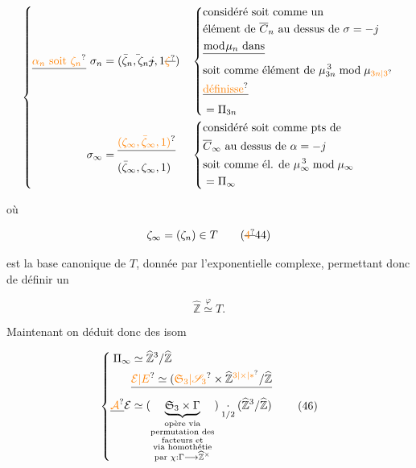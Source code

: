 \[
\left\{\begin{aligned}
\deleted{\unsure{\alpha_n\text{ soit }\zeta_n}}\ \sigma_n
&=(\bar\zeta_n,\deleted{\bar{\vphantom\zeta}}\zeta_n\deleted{j},1\deleted{\unsure{\zeta}})
&&\left\{\begin{aligned}
&\text{considéré soit comme un}\\[-.3ex]
&\text{élément de }\overline C_n\text{ au dessus de }\sigma=-j\\
&\deleted{\bmod\mu_n\text{ dans}}\\
&\text{soit comme élément de }\mu_{3n}^{\,3}\bmod\mu_{\unsure{3n|3}}\\
&\deleted{\unsure{\text{définisse}}}\\[-.3ex]
&=\Pi_{3n}
\end{aligned}\right.\\
\sigma_\infty&=\begin{aligned}
&\deleted{\unsure{(\zeta_\infty,\bar\zeta_\infty,1)}}\\
&(\bar\zeta_\infty,\zeta_\infty,1)
\end{aligned}
&&\left\{\begin{aligned}
&\text{considéré soit comme pts de}\\
&\overline C_\infty\text{ au dessus de }\alpha=-j\\
&\text{soit comme él. de }\mu_\infty^{\,3}\bmod\mu_\infty\\
&=\Pi_\infty
\end{aligned}\right.
\end{aligned}\right.
\]

où

\[
\zeta_\infty=(\zeta_n)\in T
\tag*{(\deleted{\unsure{4}}44)}
\]

est la base canonique de $T$, donnée par l'exponentielle complexe, permettant donc de définir un 

\[
\widehat{\mathbb Z}\mathrel{\overset{\varphi}{\simeq}}T .
\tag*{(45)}
\]


Maintenant on déduit donc des isom

\[
\left\{\begin{aligned}
\Pi_\infty&\simeq\widehat{\mathbb Z}^{3}/\widehat{\mathbb Z}\\
&\deleted{\unsure{\mathcal E|E}\simeq(\unsure{\mathfrak S_3|\mathscr S_3}\times\widehat{\mathbb Z}^{\unsure{3|\times|*}}/\widehat{\mathbb Z}}\\
\deleted{\unsure{\mathcal A}}\mathcal E&\simeq(\underbrace{\mathfrak S_3\times\Gamma}_{\substack{\text{opère via}\\\text{permutation des}\\\text{facteurs et}\\\text{via homothétie}\\\text{par }\chi:\Gamma\longrightarrow\widehat{\mathbb Z}^{\times}}})\underset{1/2}{\cdot}(\widehat{\mathbb Z}^{3}/\widehat{\mathbb Z})
\end{aligned}\right.\tag*{(46)}
\]


